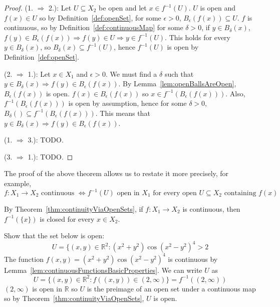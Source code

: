 \begin{proof}
	(1. $\Rightarrow$ 2.): Let $U \subseteq X_2$ be open and let $x \in f^{-1}(U)$. $U$ is open and $f(x) \in U$ so by Definition~\ref{def:openSet}, for some $\epsilon > 0$, $B_{\epsilon}(f(x)) \subseteq U$. $f$ is continuous, so by Definition~\ref{def:continuousMap} for some $\delta > 0$, if $y \in B_{\delta}(x)$, $f(y) \in B_{\epsilon}(f(x)) \Longrightarrow f(y) \in U \Longrightarrow y \in f^{-1}(U)$. This holds for every $y \in B_{\delta}(x)$, so $B_{\delta}(x) \subseteq f^{-1}(U)$, hence $f^{-1}(U)$ is open by Definition~\ref{def:openSet}.

	(2. $\Rightarrow$ 1.): Let $x \in X_1$ and $\epsilon > 0$. We must find a $\delta$ such that $y \in B_{\delta}(x) \Longrightarrow f(y) \in B_{\epsilon}(f(x))$. By Lemma~\ref{lem:openBallsAreOpen}, $B_{\epsilon}(f(x))$ is open. $f(x) \in B_{\epsilon}(f(x))$ so $x \in f^{-1}(B_{\epsilon}(f(x)))$. Also, $f^{-1}(B_{\epsilon}(f(x)))$ is open by assumption, hence for some $\delta > 0$, $B_{\delta}() \subseteq f^{-1}(B_{\epsilon}(f(x)))$. This means that $y \in B_{\delta}(x) \Longrightarrow f(y) \in B_{\epsilon}(f(x))$.

	(1. $\Rightarrow$ 3.): TODO.
	
	(3. $\Rightarrow$ 1.): TODO.
\end{proof}

\begin{remark}
	The proof of the above theorem allows us to restate it more precisely, for example,
	\[
		f: X_1 \rightarrow X_2 \text{ continuous } \Longleftrightarrow f^{-1}(U) \text{ open in } X_1 \text{ for every open } U \subseteq X_2 \text{ containing } f(x)
	\]
\end{remark}

\begin{remark}
	By Theorem~\ref{thm:continuityViaOpenSets}, if $f: X_1 \rightarrow X_2$ is continuous, then $f^{-1}(\{ x \})$ is closed for every $x \in X_2$.
\end{remark}

\begin{example}
	Show that the set below is open:
	\[
		U = \{ (x, y) \in \mathbb{R}^2: (x^2 + y^2) {\cos(x^2 - y^2)}^4 > 2
	\]
	The function $f(x, y) = (x^2 + y^2) {\cos(x^2 - y^2)}^4$ is continuous by Lemma~\ref{lem:continuousFunctionsBasicProperties}. We can write $U$ as
	\[
		U = \{ (x, y) \in \mathbb{R}^2: f((x, y)) \in (2, \infty) \} = f^{-1}((2, \infty))
	\]
	$(2, \infty)$ is open in $\mathbb{R}$ so $U$ is the preimage of an open set under a continuous map so by Theorem~\ref{thm:continuityViaOpenSets}, $U$ is open.
\end{example}

